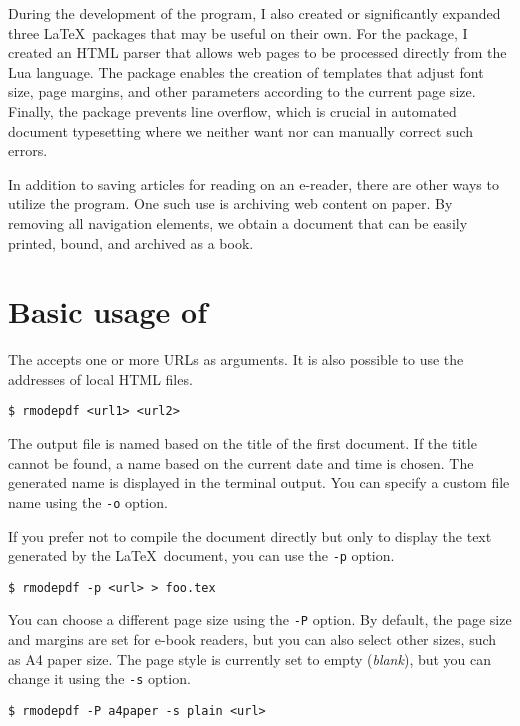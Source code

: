 \documentclass{ltugboat}
\begin{document}
During the development of the program, I also created or significantly expanded
three \LaTeX\ packages that may be useful on their own. For the 
package, I created an HTML parser that allows web pages to be processed
directly from the Lua language. The  package enables the
creation of templates that adjust font size, page margins, and other parameters
according to the current page size. Finally, the  package
prevents line overflow, which is crucial in automated document typesetting
where we neither want nor can manually correct such errors.

In addition to saving articles for reading on an e-reader, there are other ways
to utilize the  program. One such use is archiving web
content on paper. By removing all navigation elements, we obtain a document
that can be easily printed, bound, and archived as a book.

\section{Basic usage of }

The  accepts one or more URLs as arguments. It is also
possible to use the addresses of local HTML files.

\begin{verbatim}
$ rmodepdf <url1> <url2>
\end{verbatim}


The output file is named based on the title of the first document. If the title
cannot be found, a name based on the current date and time is chosen. The
generated name is displayed in the terminal output. You can specify a custom
file name using the \texttt{-o} option.

If you prefer not to compile the document directly but only to display the text
generated by the \LaTeX\ document, you can use the \texttt{-p} option.

\begin{verbatim}
$ rmodepdf -p <url> > foo.tex
\end{verbatim}

You can choose a different page size using the \texttt{-P} option. By default,
the page size and margins are set for e-book readers, but you can also select
other sizes, such as A4 paper size. The page style is currently set to empty
(\textit{blank}), but you can change it using the \texttt{-s} option.

\begin{verbatim}
$ rmodepdf -P a4paper -s plain <url>
\end{verbatim}
\end{document}
